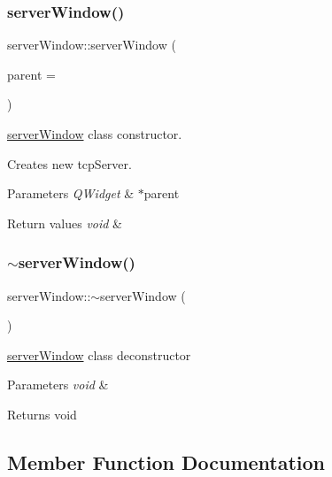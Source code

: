\subsubsection{\texorpdfstring{server\+Window()}{serverWindow()}}
{\footnotesize\ttfamily server\+Window\+::server\+Window (\begin{DoxyParamCaption}\item[{Q\+Widget $\ast$}]{parent = {} }\end{DoxyParamCaption})\hspace{0.3cm}{\ttfamily [explicit]}}



\mbox{\hyperlink{classserver_window}{server\+Window}} class constructor. 

Creates new tcp\+Server. 
\begin{DoxyParams}{Parameters}
{\em Q\+Widget} & $\ast$parent \\
\hline
\end{DoxyParams}

\begin{DoxyRetVals}{Return values}
{\em void} & \\
\hline
\end{DoxyRetVals}
\mbox{\label{classserver_window_a8690c73305f40b9b8bc4ee0f42833d4a}} 
\subsubsection{\texorpdfstring{$\sim$server\+Window()}{~serverWindow()}}
{\footnotesize\ttfamily server\+Window\+::$\sim$server\+Window (\begin{DoxyParamCaption}{ }\end{DoxyParamCaption})}



\mbox{\hyperlink{classserver_window}{server\+Window}} class deconstructor 


\begin{DoxyParams}{Parameters}
{\em void} & \\
\hline
\end{DoxyParams}
\begin{DoxyReturn}{Returns}
void 
\end{DoxyReturn}


\subsection{Member Function Documentation}
\mbox{\label{classserver_window_a802818e2dd4970c8240efa96bce4c909}} 
